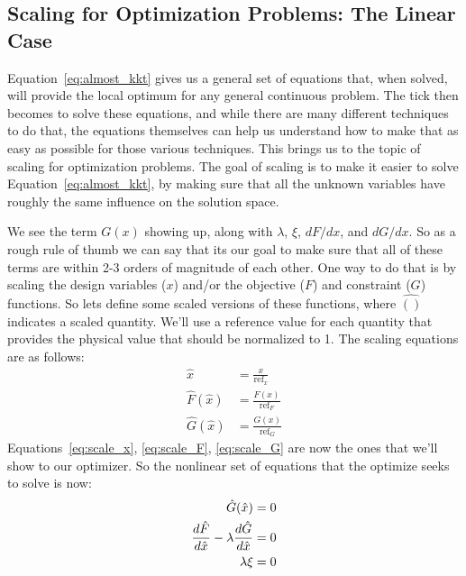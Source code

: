 \documentclass[conf]{new-aiaa}
\begin{document}
    \subsection{Scaling for Optimization Problems: The Linear Case}

    Equation~\eqref{eq:almost_kkt} gives us a general set of equations that, when solved, will provide the local optimum for any general continuous problem. 
    The tick then becomes to solve these equations, and while there are many different techniques to do that, the equations themselves can help us understand how to make that as easy as possible for those various techniques. 
    This brings us to the topic of scaling for optimization problems. 
    The goal of {}scaling is to make it easier to solve Equation~\eqref{eq:almost_kkt}, by making sure that all the unknown variables have roughly the same influence on the solution space. 

    We see the term $G(x)$ showing up, along with $\lambda$, $\xi$, $dF/dx$, and $dG/dx$. 
    So as a rough rule of thumb we can say that its our goal to make sure that all of these terms are within 2-3 orders of magnitude of each other. 
    One way to do that is by scaling the design variables ($x$) and/or the objective ($F$) and constraint ($G$) functions. 
    So lets define some scaled versions of these functions, where $\hat{()}$ indicates a scaled quantity. 
    We'll use a reference value for each quantity that provides the physical value that should be normalized to 1. The scaling equations are as follows:
    \begin{align}
        \hat{x} &= \frac{x}{\text{ref}_x} \label{eq:scale_x}\\
        \hat{F}(\hat{x}) &= \frac{F(x)}{\text{ref}_F} \label{eq:scale_F}\\
        \hat{G}(\hat{x}) &= \frac{G(x)}{\text{ref}_G} \label{eq:scale_G}
    \end{align}
    Equations~\eqref{eq:scale_x}, \eqref{eq:scale_F}, \eqref{eq:scale_G} are now the ones that we'll show to our optimizer. 
    So the nonlinear set of equations that the optimize seeks to solve is now: 
    \begin{align}
        \hat{G}(\hat{x}) &= 0 \notag \\
        \frac{d\hat{F}}{d\hat{x}} - \lambda \frac{d\hat{G}}{d\hat{x}} &= 0 \notag \\
        \lambda \xi &= 0
        \label{eq:almost_kkt_scaled}
    \end{align}
\end{document}

